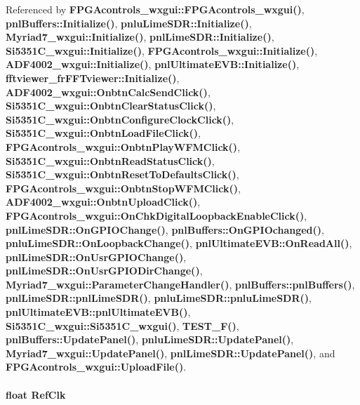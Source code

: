 Referenced by {\bf F\+P\+G\+Acontrols\+\_\+wxgui\+::\+F\+P\+G\+Acontrols\+\_\+wxgui()}, {\bf pnl\+Buffers\+::\+Initialize()}, {\bf pnlu\+Lime\+S\+D\+R\+::\+Initialize()}, {\bf Myriad7\+\_\+wxgui\+::\+Initialize()}, {\bf pnl\+Lime\+S\+D\+R\+::\+Initialize()}, {\bf Si5351\+C\+\_\+wxgui\+::\+Initialize()}, {\bf F\+P\+G\+Acontrols\+\_\+wxgui\+::\+Initialize()}, {\bf A\+D\+F4002\+\_\+wxgui\+::\+Initialize()}, {\bf pnl\+Ultimate\+E\+V\+B\+::\+Initialize()}, {\bf fftviewer\+\_\+fr\+F\+F\+Tviewer\+::\+Initialize()}, {\bf A\+D\+F4002\+\_\+wxgui\+::\+Onbtn\+Calc\+Send\+Click()}, {\bf Si5351\+C\+\_\+wxgui\+::\+Onbtn\+Clear\+Status\+Click()}, {\bf Si5351\+C\+\_\+wxgui\+::\+Onbtn\+Configure\+Clock\+Click()}, {\bf Si5351\+C\+\_\+wxgui\+::\+Onbtn\+Load\+File\+Click()}, {\bf F\+P\+G\+Acontrols\+\_\+wxgui\+::\+Onbtn\+Play\+W\+F\+M\+Click()}, {\bf Si5351\+C\+\_\+wxgui\+::\+Onbtn\+Read\+Status\+Click()}, {\bf Si5351\+C\+\_\+wxgui\+::\+Onbtn\+Reset\+To\+Defaults\+Click()}, {\bf F\+P\+G\+Acontrols\+\_\+wxgui\+::\+Onbtn\+Stop\+W\+F\+M\+Click()}, {\bf A\+D\+F4002\+\_\+wxgui\+::\+Onbtn\+Upload\+Click()}, {\bf F\+P\+G\+Acontrols\+\_\+wxgui\+::\+On\+Chk\+Digital\+Loopback\+Enable\+Click()}, {\bf pnl\+Lime\+S\+D\+R\+::\+On\+G\+P\+I\+O\+Change()}, {\bf pnl\+Buffers\+::\+On\+G\+P\+I\+Ochanged()}, {\bf pnlu\+Lime\+S\+D\+R\+::\+On\+Loopback\+Change()}, {\bf pnl\+Ultimate\+E\+V\+B\+::\+On\+Read\+All()}, {\bf pnl\+Lime\+S\+D\+R\+::\+On\+Usr\+G\+P\+I\+O\+Change()}, {\bf pnl\+Lime\+S\+D\+R\+::\+On\+Usr\+G\+P\+I\+O\+Dir\+Change()}, {\bf Myriad7\+\_\+wxgui\+::\+Parameter\+Change\+Handler()}, {\bf pnl\+Buffers\+::pnl\+Buffers()}, {\bf pnl\+Lime\+S\+D\+R\+::pnl\+Lime\+S\+D\+R()}, {\bf pnlu\+Lime\+S\+D\+R\+::pnlu\+Lime\+S\+D\+R()}, {\bf pnl\+Ultimate\+E\+V\+B\+::pnl\+Ultimate\+E\+V\+B()}, {\bf Si5351\+C\+\_\+wxgui\+::\+Si5351\+C\+\_\+wxgui()}, {\bf T\+E\+S\+T\+\_\+\+F()}, {\bf pnl\+Buffers\+::\+Update\+Panel()}, {\bf pnlu\+Lime\+S\+D\+R\+::\+Update\+Panel()}, {\bf Myriad7\+\_\+wxgui\+::\+Update\+Panel()}, {\bf pnl\+Lime\+S\+D\+R\+::\+Update\+Panel()}, and {\bf F\+P\+G\+Acontrols\+\_\+wxgui\+::\+Upload\+File()}.

\paragraph[{Ref\+Clk}]{\setlength{\rightskip}{0pt plus 5cm}float Ref\+Clk}\label{mcu__program_2host__src_2main_8cpp_a163eabd7296e51e8ba07ab89686c406c}


